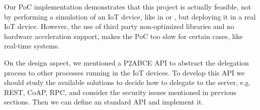 Our PoC implementation demonstrates that this project is actually feasible, not by performing a simulation of an IoT device, like in \cite{vanet} or \cite{alcaide2013anonymous}, but deploying it in a real IoT device. However, the use of third party non-optimized libraries and no hardware acceleration support, makes the PoC too slow for certain cases, like real-time systems.







On the design aspect, we mentioned a P2ABCE API to abstract the delegation process to other processes running in the IoT devices. To develop this API we should study the available solutions to decide how to delegate to the server, e.g. REST, CoAP, RPC, and consider the security issues mentioned in previous sections. Then we can define an standard API and implement it.



